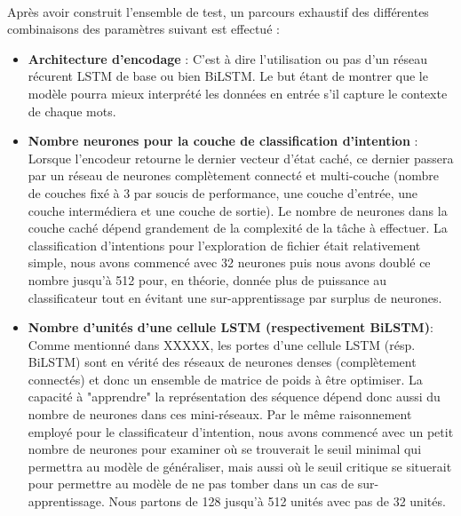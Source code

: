 	\paragraph{}
	Après avoir construit l'ensemble de test, un parcours exhaustif des différentes combinaisons des paramètres suivant est effectué : 
	\begin{itemize}
		\item \textbf{Architecture d'encodage} :
		C'est à dire l'utilisation ou pas d'un réseau récurent LSTM de base ou bien BiLSTM. Le but étant de montrer que le modèle pourra mieux interprété les données en entrée s'il capture le contexte de chaque mots.
		
		\item \textbf{Nombre neurones pour la couche de classification d'intention } : Lorsque l'encodeur retourne le dernier vecteur d'état caché, ce dernier passera par un réseau de neurones complètement connecté et multi-couche (nombre de couches fixé à 3 par soucis de performance, une couche d'entrée, une couche intermédiera et une couche de sortie). Le nombre de neurones dans la couche caché dépend grandement de la complexité de la tâche à effectuer. La classification d'intentions pour l'exploration de fichier était relativement simple, nous avons commencé avec 32 neurones puis nous avons doublé ce nombre jusqu'à 512 pour, en théorie, donnée plus de puissance au classificateur tout en évitant une sur-apprentissage par surplus de neurones.
		
		\item \textbf{Nombre d'unités d'une cellule LSTM (respectivement BiLSTM)}:
		Comme mentionné dans XXXXX, les portes d'une cellule LSTM (résp. BiLSTM) sont en vérité des réseaux de neurones denses (complètement connectés) et donc un ensemble de matrice de poids à être optimiser. La capacité à "apprendre" la représentation des séquence dépend donc aussi du nombre de neurones dans ces mini-réseaux. Par le même raisonnement employé pour le classificateur d'intention, nous avons commencé avec un petit nombre de neurones pour examiner où se trouverait le seuil minimal qui permettra au modèle de généraliser, mais aussi où le seuil critique se situerait pour permettre au modèle de ne pas tomber dans un cas de sur-apprentissage. Nous partons de 128 jusqu'à 512 unités avec pas de 32 unités.
		

\end{itemize}
